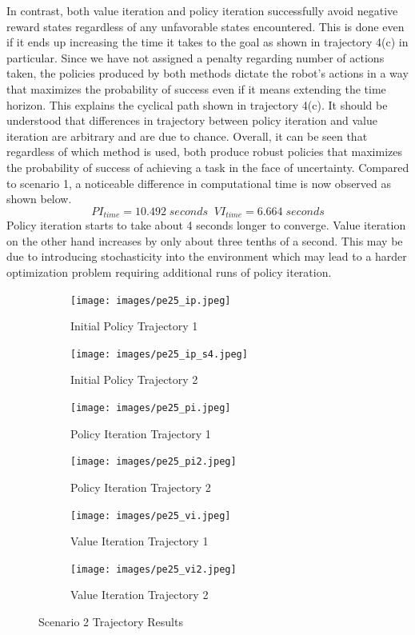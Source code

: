 \documentclass[fullpage]{article}
\begin{document}
In contrast, both value iteration and policy iteration successfully avoid negative reward states regardless of any unfavorable states encountered. This is done even if it ends up increasing the time it takes to the goal as shown in trajectory 4(c) in particular. Since we have not assigned a penalty regarding number of actions taken, the policies produced by both methods dictate the robot's actions in a way that maximizes the probability of success even if it means extending the time horizon. This explains the cyclical path shown in trajectory 4(c). It should be understood that differences in trajectory between policy iteration and value iteration are arbitrary and are due to chance. Overall, it can be seen that regardless of which method is used, both produce robust policies that maximizes the probability of success of achieving a task in the face of uncertainty. Compared to scenario 1, a noticeable difference in computational time is now observed as shown below.
\[
PI_{time} = 10.492 \; seconds \; \; VI_{time} = 6.664 \; seconds
\]
Policy iteration starts to take about 4 seconds longer to converge. Value iteration on the other hand increases by only about three tenths of a second. This may be due to introducing stochasticity into the environment which may lead to a harder optimization problem requiring additional runs of policy iteration.

\begin{figure}[H]
\begin{subfigure}{.5\textwidth}
\centering
\texttt{[image: images/pe25\_ip.jpeg]}
\caption{Initial Policy Trajectory 1}
\label{fig:1a}
\end{subfigure}
\begin{subfigure}{.5\textwidth}
\centering
\texttt{[image: images/pe25\_ip\_s4.jpeg]}
\caption{Initial Policy Trajectory 2}
\label{fig:1b}
\end{subfigure}
\begin{subfigure}{.5\textwidth}
\centering
\texttt{[image: images/pe25\_pi.jpeg]}
\caption{Policy Iteration Trajectory 1}
\label{fig:2a}
\end{subfigure}
\begin{subfigure}{.5\textwidth}
\centering
\texttt{[image: images/pe25\_pi2.jpeg]}
\caption{Policy Iteration Trajectory 2}
\label{fig:2b}
\end{subfigure}
\begin{subfigure}{.5\textwidth}
\centering
\texttt{[image: images/pe25\_vi.jpeg]}
\caption{Value Iteration Trajectory 1}
\label{fig:3a}
\end{subfigure}
\begin{subfigure}{.5\textwidth}
\centering
\texttt{[image: images/pe25\_vi2.jpeg]}
\caption{Value Iteration Trajectory 2}
\label{fig:3b}
\end{subfigure}
\caption{Scenario 2 Trajectory Results}
\end{figure}
\end{document}
